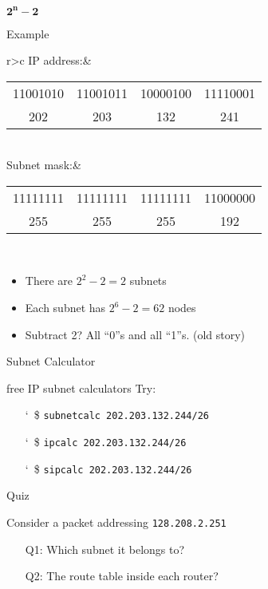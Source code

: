 \begin{frame}{$\mathbf{2^n-2}$}
  \begin{iblock}{Example}
    \begin{tabular}{r>{\ttfamily}c}\toprule
      IP address:&\begin{tabular}{c@{.}c@{.}c@{.}c}
                    11001010&11001011&10000100&11110001\\
                    202&203&132&241
                  \end{tabular}\\\midrule
      Subnet mask:&\begin{tabular}{c@{.}c@{.}c@{.}c}
                     11111111&11111111&11111111&11000000\\
                     255&255&255&192
                   \end{tabular}\\\bottomrule
    \end{tabular}
  \end{iblock}

  \begin{itemize}
  \item There are $2^2-2 = 2$ subnets
  \item Each subnet has $2^6-2 = 62$ nodes
  \item Subtract 2? All ``0''s and all ``1''s. (old story)
  \end{itemize}
\end{frame}

\begin{frame}{Subnet Calculator}
  \begin{iblock}{free IP subnet calculators}
    Try:
    \begin{itemize}
    \item[\char`~\$]  \texttt{subnetcalc 202.203.132.244/26}
    \item[\char`~\$]  \texttt{ipcalc 202.203.132.244/26}
    \item[\char`~\$]  \texttt{sipcalc 202.203.132.244/26}
    \end{itemize}
  \end{iblock}
\end{frame}

\begin{frame}{Quiz}
  \begin{center}
  \end{center}
  Consider a packet addressing \texttt{128.208.2.251}
  \begin{itemize}
  \item[Q1:] Which subnet it belongs to?
  \item[Q2:] The route table inside each router?
  \end{itemize}
\end{frame}

